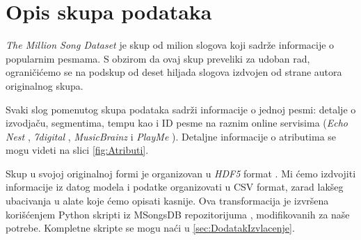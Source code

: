 \section{Opis skupa podataka}
\label{sec:Opis skupa podataka}

\emph{The Million Song Dataset} \cite{Dataset} je skup od milion slogova koji sadr\v{z}e informacije o popularnim pesmama. S obzirom da ovaj skup preveliki za udoban rad, ograni\v{c}i\'c{}emo se na podskup od deset hiljada slogova izdvojen od strane autora originalnog skupa.

Svaki slog pomenutog skupa podataka sadr\v{z}i informacije o jednoj pesmi: detalje o izvodja\v{c}u, segmentima, tempu kao i ID pesme na raznim online servisima (\emph{Echo Nest} \cite{EchoNest}, \emph{7digital} \cite{7digital},  \emph{MusicBrainz} \cite{MusicBrainz} i \emph{PlayMe} \cite{PlayMe}). Detaljne informacije o atributima se mogu videti na slici \ref{fig:Atributi}.

Skup u svojoj originalnoj formi je organizovan u \emph{HDF5} format \cite{HDF5}. Mi \'c{}emo izdvojiti informacije iz datog modela i podatke organizovati u CSV format, zarad lak\v{s}eg ubacivanja u alate koje \'c{}emo opisati kasnije. Ova transformacija je izvr\v{s}ena kori\v{s}\'c{}enjem Python skripti iz MSongsDB repozitorijuma \cite{MSongsDB}, modifikovanih za na\v{s}e potrebe. Kompletne skripte se mogu na\'c{}i u \ref{sec:DodatakIzvlacenje}.

